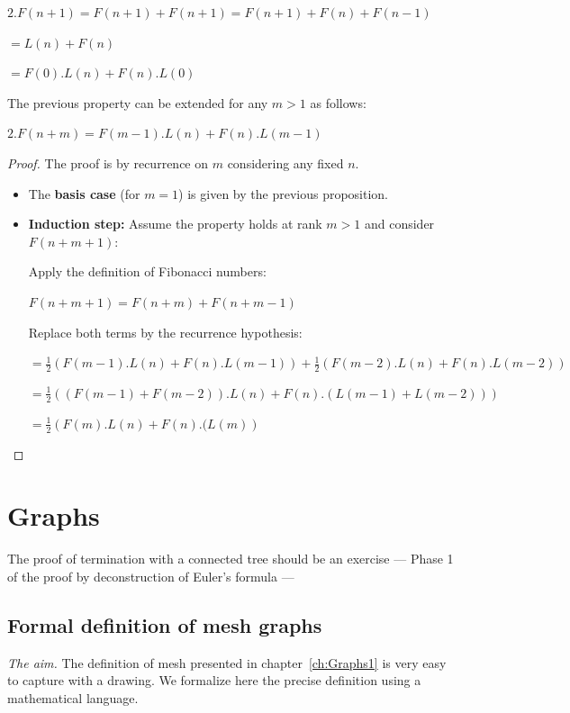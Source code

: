 $2.F(n+1) = F(n+1) +  F(n+1) =  F(n+1) + F(n) + F(n-1)$

$= L(n) + F(n) $

$= F(0).L(n) + F(n).L(0)$
\medskip


The previous property can be extended for any $m>1$ as follows:
\medskip

\begin{prop} 
$2.F(n+m) = F(m-1).L(n) + F(n).L(m-1)$
\end{prop}

\begin{proof}
The proof is by recurrence on $m$ considering any fixed $n$.
\begin{itemize}
\item
The \textbf{basis case} (for $m=1$) is given by the previous proposition.

\item
\textbf{Induction step:} 
Assume the property holds at rank $m > 1$ and consider $F(n+m+1)$:

Apply the definition of Fibonacci numbers: 

$F(n+m+1) = F(n+m)+F(n+m-1)$ 

Replace both terms by the recurrence hypothesis:

$= \frac{1}{2} (F(m-1).L(n) + F(n).L(m-1)) + \frac{1}{2} (F(m-2).L(n) + F(n).L(m-2))$

$= \frac{1}{2} \left( (F(m-1)+F(m-2)).L(n) + F(n).(L(m-1)+L(m-2))\right)$

$= \frac{1}{2} \left(F(m).L(n) + F(n).(L(m)\right)$
\end{itemize}

\end{proof}



\section{Graphs}


{\Arny The proof of termination with a connected tree should be an
  exercise --- Phase 1 of the proof by deconstruction of Euler's
  formula} ---


\subsection{Formal definition of mesh graphs}
\label{Exercice:FormalDefinitionMesh}

\noindent \textit{The aim.}
The definition of mesh presented in chapter~\ref{ch:Graphs1}
is very easy to capture with a drawing.
We formalize here the precise definition using a mathematical language. 
\medskip

